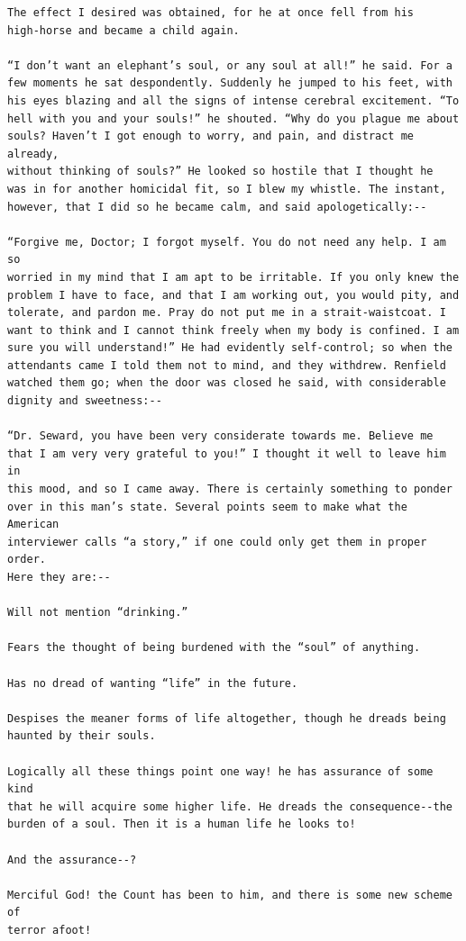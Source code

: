 \documentclass{article}
\begin{document}
\begin{verbatim}
The effect I desired was obtained, for he at once fell from his
high-horse and became a child again.

“I don’t want an elephant’s soul, or any soul at all!” he said. For a
few moments he sat despondently. Suddenly he jumped to his feet, with
his eyes blazing and all the signs of intense cerebral excitement. “To
hell with you and your souls!” he shouted. “Why do you plague me about
souls? Haven’t I got enough to worry, and pain, and distract me already,
without thinking of souls?” He looked so hostile that I thought he
was in for another homicidal fit, so I blew my whistle. The instant,
however, that I did so he became calm, and said apologetically:--

“Forgive me, Doctor; I forgot myself. You do not need any help. I am so
worried in my mind that I am apt to be irritable. If you only knew the
problem I have to face, and that I am working out, you would pity, and
tolerate, and pardon me. Pray do not put me in a strait-waistcoat. I
want to think and I cannot think freely when my body is confined. I am
sure you will understand!” He had evidently self-control; so when the
attendants came I told them not to mind, and they withdrew. Renfield
watched them go; when the door was closed he said, with considerable
dignity and sweetness:--

“Dr. Seward, you have been very considerate towards me. Believe me
that I am very very grateful to you!” I thought it well to leave him in
this mood, and so I came away. There is certainly something to ponder
over in this man’s state. Several points seem to make what the American
interviewer calls “a story,” if one could only get them in proper order.
Here they are:--

Will not mention “drinking.”

Fears the thought of being burdened with the “soul” of anything.

Has no dread of wanting “life” in the future.

Despises the meaner forms of life altogether, though he dreads being
haunted by their souls.

Logically all these things point one way! he has assurance of some kind
that he will acquire some higher life. He dreads the consequence--the
burden of a soul. Then it is a human life he looks to!

And the assurance--?

Merciful God! the Count has been to him, and there is some new scheme of
terror afoot!


\end{verbatim}
\end{document}

